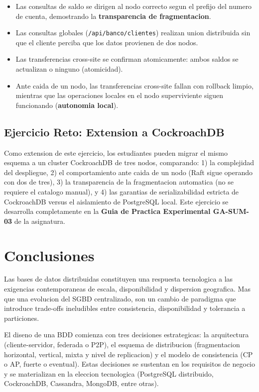 \documentclass[11pt,a4paper]{article}
\begin{document}
\begin{itemize}[leftmargin=*]
\item Las consultas de saldo se dirigen al nodo correcto segun el prefijo del numero de cuenta, demostrando la \textbf{transparencia de fragmentacion}.
\item Las consultas globales (\texttt{/api/banco/clientes}) realizan union distribuida sin que el cliente perciba que los datos provienen de dos nodos.
\item Las transferencias cross-site se confirman atomicamente: ambos saldos se actualizan o ninguno (atomicidad).
\item Ante caida de un nodo, las transferencias cross-site fallan con rollback limpio, mientras que las operaciones locales en el nodo superviviente siguen funcionando (\textbf{autonomia local}).
\end{itemize}

\subsection{Ejercicio Reto: Extension a CockroachDB}

Como extension de este ejercicio, los estudiantes pueden migrar el mismo esquema a un cluster CockroachDB de tres nodos, comparando: 1) la complejidad del despliegue, 2) el comportamiento ante caida de un nodo (Raft sigue operando con dos de tres), 3) la transparencia de la fragmentacion automatica (no se requiere el catalogo manual), y 4) las garantias de serializabilidad estricta de CockroachDB versus el aislamiento de PostgreSQL local. Este ejercicio se desarrolla completamente en la \textbf{Guia de Practica Experimental GA-SUM-03} de la asignatura.

\section{Conclusiones}

Las bases de datos distribuidas constituyen una respuesta tecnologica a las exigencias contemporaneas de escala, disponibilidad y dispersion geografica. Mas que una evolucion del SGBD centralizado, son un cambio de paradigma que introduce trade-offs ineludibles entre consistencia, disponibilidad y tolerancia a particiones.

El diseno de una BDD comienza con tres decisiones estrategicas: la arquitectura (cliente-servidor, federada o P2P), el esquema de distribucion (fragmentacion horizontal, vertical, mixta y nivel de replicacion) y el modelo de consistencia (CP o AP, fuerte o eventual). Estas decisiones se sustentan en los requisitos de negocio y se materializan en la eleccion tecnologica (PostgreSQL distribuido, CockroachDB, Cassandra, MongoDB, entre otras).
\end{document}
